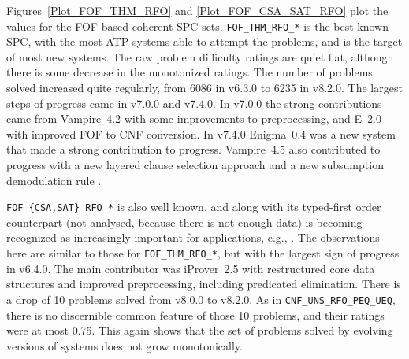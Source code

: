 \documentclass[runningheads]{llncs}
\begin{document}
Figures~\ref{Plot_FOF_THM_RFO} and \ref{Plot_FOF_CSA_SAT_RFO} plot the values for the FOF-based 
coherent SPC sets.
{\tt FOF\_THM\_RFO\_*} is the best known SPC, with the most ATP systems able to attempt the 
problems, and is the target of most new systems.
The raw problem difficulty ratings are quiet flat, although there is some decrease in the
monotonized ratings.
The number of problems solved increased quite regularly, from 6086 in v6.3.0 to 6235 in v8.2.0.
The largest steps of progress came in v7.0.0 and v7.4.0.
In v7.0.0 the strong contributions came from Vampire~4.2 with some improvements to preprocessing, 
and E~2.0 with improved FOF to CNF conversion.
In v7.4.0 Enigma~0.4 \cite{JU17,JC+20} was a new system that made a strong contribution to 
progress.
Vampire~4.5 also contributed to progress with a new layered clause selection approach 
\cite{GS20} and a new subsumption demodulation rule \cite{GKR20}.

{\tt FOF\_\{CSA,SAT\}\_RFO\_*} is also well known, and along with its typed-first order
counterpart (not analysed, because there is not enough data) is becoming recognized as 
increasingly important for applications, e.g., \cite{DKW08}.
The observations here are similar to those for {\tt FOF\_THM\_RFO\_*}, but with the largest
sign of progress in v6.4.0.
The main contributor was iProver~2.5 with restructured core data structures and improved 
preprocessing, including predicated elimination.
There is a drop of 10 problems solved from v8.0.0 to v8.2.0.
As in {\tt CNF\_UNS\_RFO\_PEQ\_UEQ}, there is no discernible common feature of those 10 problems,
and their ratings were at most 0.75.
This again shows that the set of problems solved by evolving versions of systems does not grow
monotonically.
\end{document}
